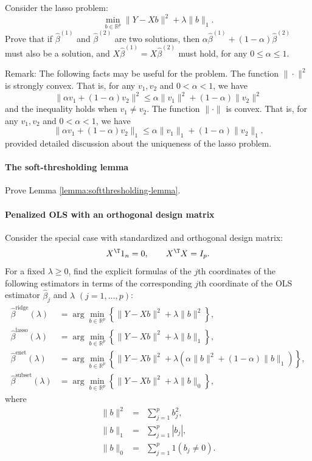 Consider the lasso problem: 
$$
\min_{b\in\mathbb{R}^{p}}   \|Y-Xb\|^{2}+\lambda\|b\|_{1} . 
$$
Prove that if $\hat{\beta}^{(1)}$ and $\hat{\beta}^{(2)}$ are two solutions, then $ \alpha  \hat{\beta}^{(1)} + (1-\alpha)  \hat{\beta}^{(2)}$ must also be a solution, and $X \hat{\beta}^{(1)} = X\hat{\beta}^{(2)}$ must hold, for any $0\leq  \alpha  \leq 1$. 




Remark: 
The following facts may be useful for the problem.
The function $\| \cdot \|^2$ is strongly convex. That is, for any $v_1, v_2$ and $ 0< \alpha < 1$, we have
$$
\|   \alpha  v_1  +(1-\alpha ) v_2     \|^2 \leq \alpha \| v_1 \|^2 + (1- \alpha ) \| v_2 \|^2
$$
and the inequality holds when $v_1 \neq v_2$.  The function $\|\cdot \|$ is convex. That is, for any $v_1, v_2$ and $ 0< \alpha < 1$, we have
$$
\|   \alpha  v_1  +(1-\alpha ) v_2     \|_1 \leq \alpha \| v_1 \|_1 + (1- \alpha ) \| v_2 \|_1.
$$
\citet{tibshirani2013lasso} provided detailed discussion about the uniqueness of the lasso problem. 

 

\paragraph{The soft-thresholding lemma}\label{hw14::soft-thresholding-lemma}

Prove Lemma \ref{lemma:softthresholding-lemma}. 

\paragraph{Penalized OLS with an orthogonal design matrix}\label{hw14::orthogonal-ols-pen}

Consider the special case with standardized and orthogonal design
matrix:
\[
X^{\T}1_{n}=0,\qquad X^{\T}X=I_{p}.
\]
For a fixed $\lambda\geq0$, find the explicit formulas of the $j$th coordinates of the following
estimators in terms of the corresponding $j$th coordinate of the OLS estimator $\hat{\beta}_j$ and
$\lambda$ $(j=1,\ldots, p)$:
\begin{align*}
\hat{\beta}^{\text{ridge}}(\lambda) & =\arg\min_{b\in\mathbb{R}^{p}}\left\{ \|Y-Xb\|^{2}+\lambda\|b\|^{2}\right\} ,\\
\hat{\beta}^{\text{lasso}}(\lambda) & =\arg\min_{b\in\mathbb{R}^{p}}\left\{ \|Y-Xb\|^{2}+\lambda\|b\|_{1}\right\} ,\\
\hat{\beta}^{\text{enet}}(\lambda) & =\arg\min_{b\in\mathbb{R}^{p}}\left\{ \|Y-Xb\|^{2}+\lambda  (  \alpha \|b\|^{2} + (1-\alpha) \|b\|_{1} )  \right\}  ,\\
\hat{\beta}^{\text{subset}}(\lambda) & =\arg\min_{b\in\mathbb{R}^{p}}\left\{ \|Y-Xb\|^{2}+\lambda\|b\|_{0}\right\} ,
\end{align*}
where 
\begin{eqnarray*}
 \|b\|^2 &=&  \sum_{j=1}^{p}b_{j}^{2},\\ 
 \|b\|_{1} &=& \sum_{j=1}^{p}|b_{j}|,\\ 
 \|b\|_{0} &=& \sum_{j=1}^{p}1(b_{j}\neq0).
\end{eqnarray*}


